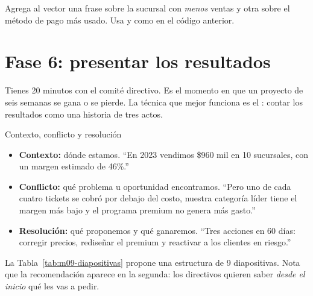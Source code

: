 \begin{hazlotu}
Agrega al vector  una frase sobre la sucursal con
\emph{menos} ventas y otra sobre el método de pago más usado. Usa
 y  como en el código anterior.
\end{hazlotu}

\section{Fase 6: presentar los resultados}
\label{sec:m09-presentacion}

Tienes 20 minutos con el comité directivo. Es el momento en que un proyecto
de seis semanas se gana o se pierde. La técnica que mejor funciona es el
: contar los resultados como una historia de
tres actos.

\begin{concepto}{Contexto, conflicto y resolución}
\begin{itemize}
  \item \textbf{Contexto:} dónde estamos. ``En 2023 vendimos \$960 mil en
        10 sucursales, con un margen estimado de 46\%.''
  \item \textbf{Conflicto:} qué problema u oportunidad encontramos. ``Pero
        uno de cada cuatro tickets se cobró por debajo del costo, nuestra
        categoría líder tiene el margen más bajo y el programa premium no
        genera más gasto.''
  \item \textbf{Resolución:} qué proponemos y qué ganaremos. ``Tres
        acciones en 60 días: corregir precios, rediseñar el premium y
        reactivar a los clientes en riesgo.''
\end{itemize}
\end{concepto}

La Tabla~\ref{tab:m09-diapositivas} propone una estructura de 9
diapositivas. Nota que la recomendación aparece en la segunda: los
directivos quieren saber \emph{desde el inicio} qué les vas a pedir.

